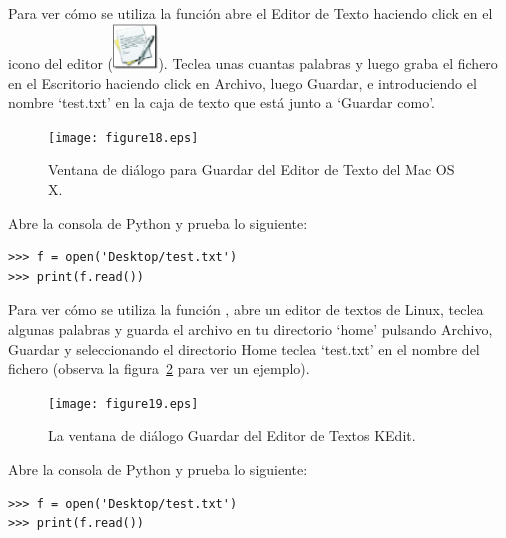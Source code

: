 \begin{MAC}
Para ver cómo se utiliza la función  abre el Editor de Texto haciendo click en el icono del editor (\includegraphics*[width=12mm]{textedit-icon.eps}).  Teclea unas cuantas palabras y luego graba el fichero en el Escritorio haciendo click en Archivo, luego Guardar, e introduciendo el nombre `test.txt' en la caja de texto que está junto a `Guardar como'.

\begin{figure}
\begin{center}
\texttt{[image: figure18.eps]}
\end{center}
\caption{Ventana de diálogo para Guardar del Editor de Texto del Mac OS X.}\label{fig18}
\end{figure}

Abre la consola de Python y prueba lo siguiente:

\begin{listing}
\begin{verbatim}
>>> f = open('Desktop/test.txt')
>>> print(f.read())
\end{verbatim}
\end{listing}

\end{MAC}

\begin{LINUX}
Para ver cómo se utiliza la función , abre un editor de textos de Linux, teclea algunas palabras y guarda el archivo en tu directorio `home' pulsando Archivo, Guardar y seleccionando el directorio Home  teclea `test.txt' en el nombre del fichero (observa la figura~\ref{fig19} para ver un ejemplo).

\begin{figure}
\begin{center}
\texttt{[image: figure19.eps]}
\end{center}
\caption{La ventana de diálogo Guardar del Editor de Textos KEdit.}\label{fig19}
\end{figure}

Abre la consola de Python y prueba lo siguiente:

\begin{listing}
\begin{verbatim}
>>> f = open('Desktop/test.txt')
>>> print(f.read())
\end{verbatim}
\end{listing}

\end{LINUX}

